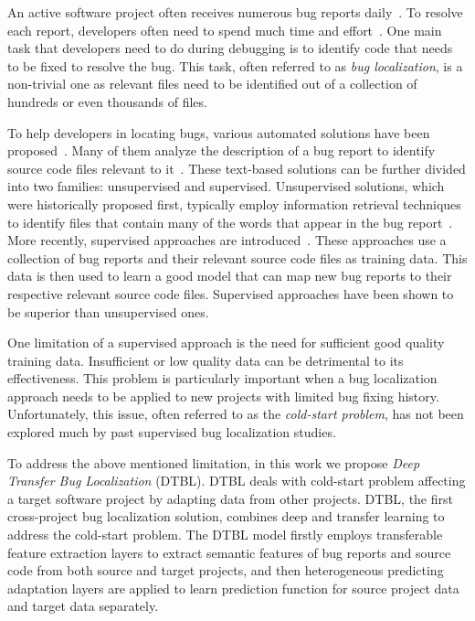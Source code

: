 An active software project often receives numerous bug reports daily~\cite{AnvikHM05}. To resolve each report, developers often need to spend much time and effort~\cite{Tassey02}. One main task that developers need to do during debugging is to identify code that needs to be fixed to resolve the bug. This task, often referred to as {\em bug localization}, is a non-trivial one as relevant files need to be identified out of a collection of hundreds or even thousands of files.

To help developers in locating bugs, various automated solutions have been proposed~\cite{JonesH05,lukins2008source,rao2011retrieval,SahaLKP14,huo2016learning}. Many of them analyze the description of a bug report to identify source code files relevant to it~\cite{lukins2008source,rao2011retrieval,SahaLKP14,huo2016learning}. These text-based solutions can be further divided into two families: unsupervised and supervised. Unsupervised solutions, which were historically proposed first, typically employ information retrieval techniques to identify files that contain many of the words that appear in the bug report~\cite{lukins2008source,rao2011retrieval,SahaLKP14}. More recently, supervised approaches are introduced~\cite{huo2016learning}. These approaches use a collection of bug reports and their relevant source code files as training data. This data is then used to learn a good model that can map new bug reports to their respective relevant source code files. Supervised approaches have been shown to be superior than unsupervised ones.

One limitation of a supervised approach is the need for sufficient good quality training data. Insufficient or low quality data can be detrimental to its effectiveness. This problem is particularly important when a bug localization approach needs to be applied to new projects with limited bug fixing history. Unfortunately, this issue, often referred to as the {\em cold-start problem}, has not been explored much by past supervised bug localization studies.

To address the above mentioned limitation, in this work we propose {\em Deep Transfer Bug Localization} (DTBL). DTBL deals with cold-start problem affecting a target software project by adapting data from other projects. DTBL, the first cross-project bug localization solution, combines deep and transfer learning to address the cold-start problem.  The DTBL model firstly employs transferable feature extraction layers to extract semantic features of bug reports and source code from both source and target projects, and then heterogeneous predicting adaptation layers are applied to learn prediction function for source project data and target data separately.  

